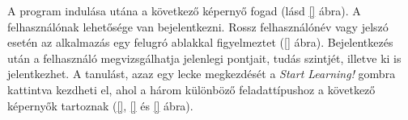 \documentclass[11pt, a4paper]{article}
\begin{document}
     A program indulása utána a következő képernyő fogad (lásd \ref{} ábra).     
     A felhasználónak lehetősége van bejelentkezni. Rossz felhasználónév vagy jelszó esetén az alkalmazás egy felugró ablakkal figyelmeztet (\ref{} ábra).
     Bejelentkezés után a felhasználó megvizsgálhatja jelenlegi pontjait, tudás szintjét, illetve ki is jelentkezhet.     
     A tanulást, azaz egy lecke megkezdését a \emph{Start Learning!} gombra kattintva kezdheti el, ahol a három különböző feladattípushoz a következő képernyők tartoznak (\ref{}, \ref{} és \ref{} ábra).
\end{document}
